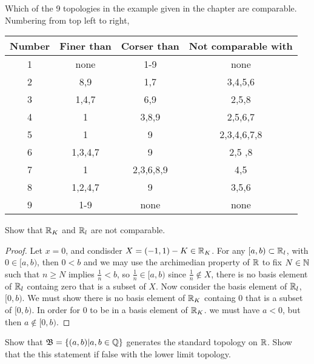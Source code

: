 


\maketitle

\question 
Which of the 9 topologies in the example given in the chapter are comparable. Numbering from top left to right, 

\begin{center}
    \begin{tabular}{ |c|c|c|c| } 
     \hline
     Number & Finer than & Corser than& Not comparable with \\ 
     \hline
     1 & none & 1-9 & none \\ 
     \hline
     2 & 8,9 & 1,7 & 3,4,5,6 \\ 
     \hline
     3 &  1,4,7 & 6,9 & 2,5,8 \\ 
     \hline
     4 & 1 & 3,8,9 & 2,5,6,7 \\ 
     \hline
     5 & 1 & 9  & 2,3,4,6,7,8 \\ 
     \hline
     6 & 1,3,4,7 & 9  & 2,5 ,8\\ 
     \hline
     7 & 1 & 2,3,6,8,9  & 4,5 \\ 
     \hline
     8 & 1,2,4,7 & 9  & 3,5,6 \\ 
     \hline
     9 & 1-9 & none  & none \\
     \hline

    \end{tabular}
    \end{center}

\question
Show that $\mathbb{R}_K$ and $\mathbb{R}_l$ are not comparable. 

\begin{proof}
    Let $x = 0$, and condisder $X = (-1, 1) - K \in \mathbb{R}_K$. For any $[a ,b) \subset \mathbb{R}_l$, with $0 \in [a, b)$, then $0 < b$ and we may use the archimedian 
    property of $\mathbb{R}$ to fix $N \in \mathbb{N}$ such that $n \geq N$ implies $\frac{1}{n} < b$, so $\frac{1}{n} \in [a, b)$ since $\frac{1}{n} \notin X$, there is no 
    basis element of $\mathbb{R}_l$ containg zero that is a subset of $X$. Now consider the basis element of $\mathbb{R}_l$, $[0, b)$. We must show there is no 
    basis element of $\mathbb{R}_K$ containg $0$ that is a subset of $[0, b)$. In order for $0$ to be in a basis element of $\mathbb{R}_K$.
    we must have $a < 0$, but then $a \notin [0, b)$. 
\end{proof}

\question 
Show that $\mathfrak{B} = \{(a, b)| a, b \in \mathbb{Q}\}$ generates the standard topology on $\mathbb{R}$. Show that the this statement if false with the lower limit topology.

